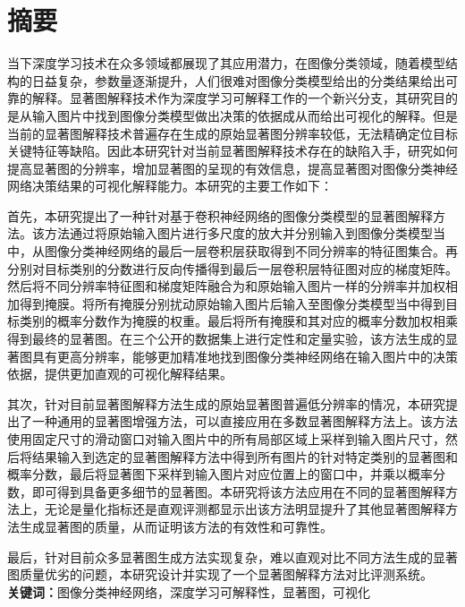 


\chapter{摘\quad 要}
\xiaosi

当下深度学习技术在众多领域都展现了其应用潜力，在图像分类领域，随着模型结构的日益复杂，参数量逐渐提升，人们很难对图像分类模型给出的分类结果给出可靠的解释。显著图解释技术作为深度学习可解释工作的一个新兴分支，其研究目的是从输入图片中找到图像分类模型做出决策的依据成从而给出可视化的解释。但是当前的显著图解释技术普遍存在生成的原始显著图分辨率较低，无法精确定位目标关键特征等缺陷。因此本研究针对当前显著图解释技术存在的缺陷入手，研究如何提高显著图的分辨率，增加显著图的呈现的有效信息，提高显著图对图像分类神经网络决策结果的可视化解释能力。本研究的主要工作如下：

首先，本研究提出了一种针对基于卷积神经网络的图像分类模型的显著图解释方法。该方法通过将原始输入图片进行多尺度的放大并分别输入到图像分类模型当中，从图像分类神经网络的最后一层卷积层获取得到不同分辨率的特征图集合。再分别对目标类别的分数进行反向传播得到最后一层卷积层特征图对应的梯度矩阵。然后将不同分辨率特征图和梯度矩阵融合为和原始输入图片一样的分辨率并加权相加得到掩膜。将所有掩膜分别扰动原始输入图片后输入至图像分类模型当中得到目标类别的概率分数作为掩膜的权重。最后将所有掩膜和其对应的概率分数加权相乘得到最终的显著图。在三个公开的数据集上进行定性和定量实验，该方法生成的显著图具有更高分辨率，能够更加精准地找到图像分类神经网络在输入图片中的决策依据，提供更加直观的可视化解释结果。

其次，针对目前显著图解释方法生成的原始显著图普遍低分辨率的情况，本研究提出了一种通用的显著图增强方法，可以直接应用在多数显著图解释方法上。该方法使用固定尺寸的滑动窗口对输入图片中的所有局部区域上采样到输入图片尺寸，然后将结果输入到选定的显著图解释方法中得到所有图片的针对特定类别的显著图和概率分数，最后将显著图下采样到输入图片对应位置上的窗口中，并乘以概率分数，即可得到具备更多细节的显著图。本研究将该方法应用在不同的显著图解释方法上，无论是量化指标还是直观评测都显示出该方法明显提升了其他显著图解释方法生成显著图的质量，从而证明该方法的有效性和可靠性。

最后，针对目前众多显著图生成方法实现复杂，难以直观对比不同方法生成的显著图质量优劣的问题，本研究设计并实现了一个显著图解释方法对比评测系统。
\\

\noindent\songti\textbf{关键词：}图像分类神经网络，深度学习可解释性，显著图，可视化

\clearpage